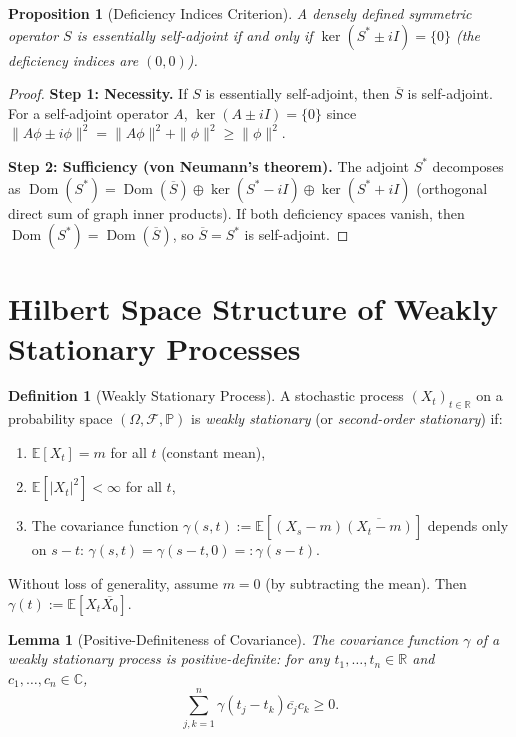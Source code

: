 \documentclass[11pt]{article}
\newtheorem{lemma}[theorem]{Lemma}
\newtheorem{proposition}[theorem]{Proposition}
\theoremstyle{definition}
\newtheorem{definition}[theorem]{Definition}
\theoremstyle{remark}
\newcommand{\C}{\mathbb{C}}
\newcommand{\R}{\mathbb{R}}
\newcommand{\E}{\mathbb{E}}
\newcommand{\Prob}{\mathbb{P}}
\newcommand{\1}{\mathbbm{1}}
\DeclareMathOperator{\Dom}{Dom}
\begin{document}
\begin{proposition}[Deficiency Indices Criterion]\label{prop:deficiency}
A densely defined symmetric operator $S$ is essentially self-adjoint if and only if $\ker(S^*\pm iI)=\{0\}$ (the deficiency indices are $(0,0)$).
\end{proposition}

\begin{proof}
\textbf{Step 1: Necessity.}
If $S$ is essentially self-adjoint, then $\overline{S}$ is self-adjoint. For a self-adjoint operator $A$, $\ker(A\pm iI)=\{0\}$ since $\|A\phi\pm i\phi\|^2=\|A\phi\|^2+\|\phi\|^2\geq\|\phi\|^2$.

\textbf{Step 2: Sufficiency (von Neumann's theorem).}
The adjoint $S^*$ decomposes as $\Dom(S^*)=\Dom(\overline{S})\oplus\ker(S^*-iI)\oplus\ker(S^*+iI)$ (orthogonal direct sum of graph inner products). If both deficiency spaces vanish, then $\Dom(S^*)=\Dom(\overline{S})$, so $\overline{S}=S^*$ is self-adjoint.
\end{proof}

\section{Hilbert Space Structure of Weakly Stationary Processes}

\begin{definition}[Weakly Stationary Process]
A stochastic process $(X_t)_{t\in\R}$ on a probability space $(\Omega,\mathcal{F},\Prob)$ is \emph{weakly stationary} (or \emph{second-order stationary}) if:
\begin{enumerate}[label=(\roman*)]
\item $\E[X_t]=m$ for all $t$ (constant mean),
\item $\E[|X_t|^2]<\infty$ for all $t$,
\item The covariance function $\gamma(s,t):=\E[(X_s-m)\overline{(X_t-m)}]$ depends only on $s-t$: $\gamma(s,t)=\gamma(s-t,0)=:\gamma(s-t)$.
\end{enumerate}
\end{definition}

Without loss of generality, assume $m=0$ (by subtracting the mean). Then $\gamma(t):=\E[X_t\overline{X_0}]$.

\begin{lemma}[Positive-Definiteness of Covariance]\label{lem:covariance_pd}
The covariance function $\gamma$ of a weakly stationary process is positive-definite: for any $t_1,\ldots,t_n\in\R$ and $c_1,\ldots,c_n\in\C$,
\[
\sum_{j,k=1}^n\gamma(t_j-t_k)\overline{c_j}c_k\geq 0.
\]
\end{lemma}
\end{document}
